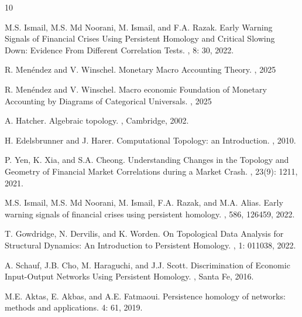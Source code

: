 \documentclass[12pt,reqno]{amsart}
\theoremstyle{definition}
\numberwithin{equation}{section}
\begin{document}
	\begin{thebibliography}{10}
    
        M.S. Ismail, M.S. Md Noorani, M. Ismail, and F.A. Razak.
        \newblock Early Warning Signals of Financial Crises Using Persistent Homology and Critical Slowing Down: Evidence From Different Correlation Tests.
        , 8: 30, 2022.

        R. Men\'{e}ndez and V. Winschel.
        \newblock Monetary Macro Accounting Theory.
        , 2025

        R. Men\'{e}ndez and V. Winschel.
        \newblock Macro economic Foundation of Monetary Accounting by Diagrams of Categorical Universals.
        , 2025

        A. Hatcher.
        \newblock Algebraic topology.
        , Cambridge, 2002.
        
        H. Edelsbrunner and J. Harer. 
        \newblock Computational Topology: an Introduction.
        , 2010.

        P. Yen, K. Xia, and S.A. Cheong.
        \newblock Understanding Changes in the Topology and Geometry of Financial Market Correlations during a Market Crash.
        , 23(9): 1211, 2021.

        M.S. Ismail, M.S. Md Noorani, M. Ismail, F.A. Razak, and M.A. Alias.
        \newblock Early warning signals of financial crises using persistent homology.
        , 586, 126459, 2022.

        T. Gowdridge, N. Dervilis, and K. Worden.
        \newblock On Topological Data Analysis for Structural Dynamics: An Introduction to Persistent Homology.
        , 1: 011038, 2022.

        A. Schauf, J.B. Cho, M. Haraguchi, and J.J. Scott. 
        \newblock Discrimination of Economic Input-Output Networks Using Persistent Homology.
        , Santa Fe, 2016.

        M.E. Aktas, E. Akbas, and A.E. Fatmaoui.
        \newblock Persistence homology of networks: methods and applications. 
         4: 61, 2019. 

	\end{thebibliography}
	
\end{document}
